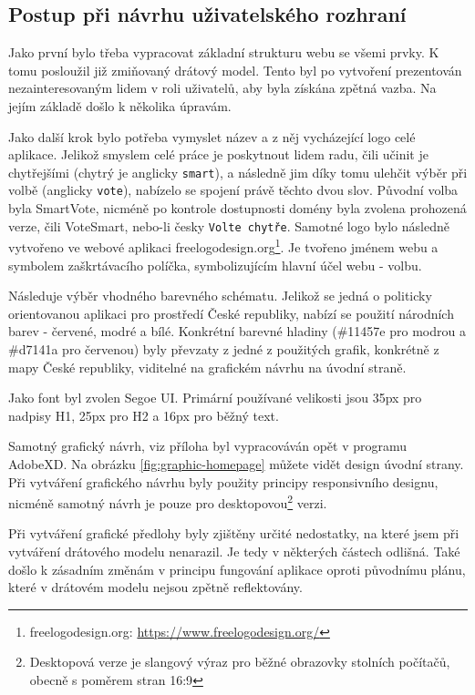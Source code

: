 \subsection{Postup při návrhu uživatelského rozhraní}
Jako první bylo třeba vypracovat základní strukturu webu se všemi prvky. K tomu posloužil již zmiňovaný drátový model. Tento byl po vytvoření prezentován nezainteresovaným lidem v roli uživatelů, aby byla získána zpětná vazba. Na jejím základě došlo k několika úpravám.
\par Jako další krok bylo potřeba vymyslet název a z něj vycházející logo celé aplikace. Jelikož smyslem celé práce je poskytnout lidem radu, čili učinit je chytřejšími (chytrý je anglicky \texttt{smart}), a následně jim díky tomu ulehčit výběr při volbě (anglicky \texttt{vote}), nabízelo se spojení právě těchto dvou slov. Původní volba byla SmartVote, nicméně po kontrole dostupnosti domény byla zvolena prohozená verze, čili VoteSmart, nebo-li česky \texttt{Volte chytře}. Samotné logo bylo následně vytvořeno ve webové aplikaci freelogodesign.org\footnote{freelogodesign.org: \url{https://www.freelogodesign.org/}}. Je tvořeno jménem webu a symbolem zaškrtávacího políčka, symbolizujícím hlavní účel webu - volbu.
\par Následuje výběr vhodného barevného schématu. Jelikož se jedná o politicky orientovanou aplikaci pro prostředí České republiky, nabízí se použití národních barev - červené, modré a bílé. Konkrétní barevné hladiny (\#11457e pro modrou a \#d7141a pro červenou) byly převzaty z jedné z použitých grafik, konkrétně z mapy České republiky\cite{grafika-mapa}, viditelné na grafickém návrhu na úvodní straně. 
\par Jako font byl zvolen Segoe UI. Primární používané velikosti jsou 35px pro nadpisy H1, 25px pro H2 a 16px pro běžný text.
\par Samotný grafický návrh, viz příloha  byl vypracováván opět v programu AdobeXD. Na obrázku \ref{fig:graphic-homepage} můžete vidět design úvodní strany. Při vytváření grafického návrhu byly použity principy responsivního designu, nicméně samotný návrh je pouze pro desktopovou\footnote{Desktopová verze je slangový výraz pro běžné obrazovky stolních počítačů, obecně s poměrem stran 16:9} verzi. 

\par Při vytváření grafické předlohy byly zjištěny určité nedostatky, na které jsem při vytváření drátového modelu nenarazil. Je tedy v některých částech odlišná. Také došlo k zásadním změnám v principu fungování aplikace oproti původnímu plánu, které v drátovém modelu nejsou zpětně reflektovány. 


